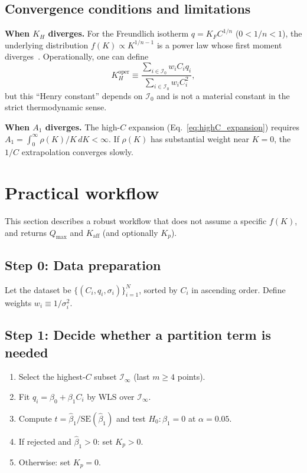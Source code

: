 \documentclass[12pt]{article}
\begin{document}
\subsection{Convergence conditions and limitations}
\label{sec:convergence}

\textbf{When $K_H$ diverges.}
For the Freundlich isotherm $q=K_F C^{1/n}$ ($0<1/n<1$), the underlying
distribution $f(K)\propto K^{1/n-1}$ is a power law whose first moment
diverges~\cite{Jaroniec1988}.
Operationally, one can define
\begin{equation}
  K_H^{\mathrm{oper}} \equiv
  \frac{\sum_{i\in\mathcal{I}_0} w_i C_i q_i}
       {\sum_{i\in\mathcal{I}_0} w_i C_i^2},
  \label{eq:KH_operational}
\end{equation}
but this ``Henry constant'' depends on $\mathcal{I}_0$ and is not a
material constant in the strict thermodynamic sense.

\textbf{When $A_1$ diverges.}
The high-$C$ expansion (Eq.~\ref{eq:highC_expansion}) requires
$A_1=\int_0^\infty\rho(K)/K\,dK<\infty$.  If $\rho(K)$ has substantial
weight near $K=0$, the $1/C$ extrapolation converges slowly.

\section{Practical workflow}
\label{sec:workflow}

This section describes a robust workflow that does not assume a specific
$f(K)$, and returns $Q_{\max}$ and $K_{\mathrm{aff}}$ (and optionally
$K_p$).

\subsection{Step 0: Data preparation}

Let the dataset be $\{(C_i,q_i,\sigma_i)\}_{i=1}^N$, sorted by
$C_i$ in ascending order.  Define weights $w_i\equiv 1/\sigma_i^2$.

\subsection{Step 1: Decide whether a partition term is needed}

\begin{enumerate}[nosep]
  \item Select the highest-$C$ subset $\mathcal{I}_\infty$ (last $m\ge 4$ points).
  \item Fit $q_i = \beta_0 + \beta_1 C_i$ by WLS over $\mathcal{I}_\infty$.
  \item Compute $t = \widehat{\beta}_1 / \mathrm{SE}(\widehat{\beta}_1)$
        and test $H_0:\beta_1=0$ at $\alpha=0.05$.
  \item If rejected and $\widehat{\beta}_1>0$: set $K_p>0$.
  \item Otherwise: set $K_p=0$.
\end{enumerate}
\end{document}

